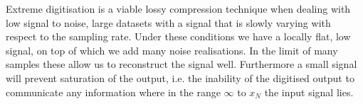 \documentclass[apj]{emulateapj}
\begin{document}
Extreme digitisation is a viable lossy compression technique when dealing with low signal to noise, large datasets with a signal that is slowly varying with respect to the sampling rate. Under these conditions we have a locally flat, low signal, on top of which we add many noise realisations. In the limit of many samples these allow us to reconstruct the signal well. Furthermore a small signal will prevent saturation of the output, i.e. the inability of the digitised output to communicate any information where in the range $\infty$ to $x_N$ the input signal lies.


\end{document}
